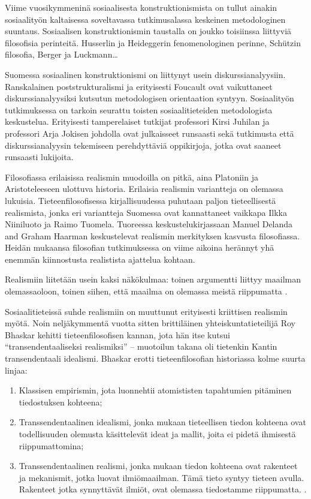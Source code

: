 \documentclass[a4paper,11pt,finnish]{article}
\begin{document}
Viime vuosikymmeninä sosiaalisesta konstruktionismista on tullut ainakin
sosiaalityön kaltaisessa soveltavassa tutkimusalassa keskeinen
metodologinen suuntaus. Sosiaalisen konstruktionismin taustalla on
joukko toisiinssa liittyviä filosofisia perinteitä. Husserlin ja
Heideggerin fenomenologinen perinne, Schützin filosofia, Berger ja
Luckmann\ldots{}

Suomessa sosiaalinen konstruktionismi on liittynyt usein
diskurssianalyysiin. Ranskalainen poststrukturalismi ja erityisesti
Foucault ovat vaikuttaneet diskurssianalyysiksi kutsutun metodologisen
orientaation syntyyn. Sosiaalityön tutkimuksessa on tarkoin seurattu
toisten sosiaalitieteiden metodologista keskustelua. Erityisesti
tamperelaiset tutkijat professori Kirsi Juhilan ja professori Arja
Jokisen johdolla ovat julkaisseet runsaasti sekä tutkimusta että
diskurssianalyysin tekemiseen perehdyttäviä oppikirjoja, jotka ovat
saaneet runsaasti lukijoita.

Filosofiassa erilaisissa realismin muodoilla on pitkä, aina Platoniin ja
Aristoteleeseen ulottuva historia. Erilaisia realismin variantteja on
olemassa lukuisia. Tieteenfilosofisessa kirjallisuudessa puhutaan paljon
tieteellisestä realismista, jonka eri variantteja Suomessa ovat
kannattaneet vaikkapa Ilkka Niiniluoto ja Raimo Tuomela. Tuoreessa
keskustelukirjassaan Manuel Delanda and Graham Haarman
\citep{Delanda_Harman_2017} keskustelevat realismin merkityksen kasvusta
filosofiassa. Heidän mukaansa filosofian tutkimuksessa on viime aikoina
herännyt yhä enemmän kiinnostusta realistista ajattelua kohtaan.

Realismiin liitetään usein kaksi näkökulmaa: toinen argumentti liittyy
maailman olemassaoloon, toinen siihen, että maailma on olemassa meistä
riippumatta \cite{sep-realism}.

Sosiaalitieteissä suhde realismiin on muuttunut erityisesti kriittisen
realismin myötä. Noin neljäkymmentä vuotta sitten brittiläinen
yhteiskuntatieteilijä Roy Bhaskar kehitti tieteenfilosofisen kannan,
jota hän itse kutsui ``transendentaaliseksi realismiksi'' -- muotoilun
takana oli tietenkin Kantin transendentaali idealismi. Bhaskar erotti
tieteenfilosofian historiassa kolme suurta linjaa:

\begin{enumerate}

\item
  Klassisen empirismin, jota luonnehtii atomististen tapahtumien
  pitäminen tiedostuksen kohteena;
\item
  Transsendentaalinen idealismi, jonka mukaan tieteellisen tiedon
  kohteena ovat todellisuuden olemusta käsittelevät ideat ja mallit,
  joita ei pidetä ihmisestä riippumattomina;
\item
  Transsendentaalinen realismi, jonka mukaan tiedon kohteena ovat
  rakenteet ja mekanismit, jotka luovat ilmiömaailman. Tämä tieto syntyy
  tieteen avulla. Rakenteet jotka synnyttävät ilmiöt, ovat olemassa
  tiedostamme riippumatta. \citep[][277]{Mantysaari_1991}.
\end{enumerate}
\end{document}
